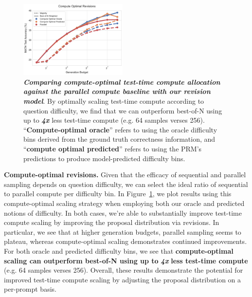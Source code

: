 \begin{figure}
  \centering
  \vspace{-0.5cm}
  \includegraphics[width=0.48\textwidth]{figures/compute_optimal_revisions_v4.pdf}
  \vspace{-0.25cm}
  \caption{\footnotesize{\textbf{\emph{Comparing compute-optimal test-time compute allocation against the parallel compute baseline with our revision model}}. By optimally scaling test-time compute according to question difficulty, we find that we can outperform best-of-N using up to \emph{\textbf{4x}} less test-time compute (e.g. 64 samples verses 256). ``\textbf{Compute-optimal oracle}'' refers to using the oracle difficulty bins derived from the ground truth correctness information, and ``\textbf{compute optimal predicted}'' refers to using the PRM's predictions to produce model-predicted difficulty bins.}}
  \label{fig:compute_optimal_revisions}
  \vspace{-0.7cm}
\end{figure}
\textbf{Compute-optimal revisions.} Given that the efficacy of sequential and parallel sampling depends on question difficulty, we can select the ideal ratio of sequential to parallel compute per difficulty bin. In Figure~\ref{fig:compute_optimal_revisions}, we plot results using this compute-optimal scaling strategy when employing both our oracle and predicted notions of difficulty. In both cases, we're able to substantially improve test-time compute scaling by improving the proposal distribution via revisions. In particular, we see that at higher generation budgets, parallel sampling seems to plateau, whereas compute-optimal scaling demonstrates continued improvements. For both oracle and predicted difficulty bins, we see that \textbf{compute-optimal scaling can outperform best-of-N using up to} \emph{\textbf{4x}} \textbf{less test-time compute} (e.g. 64 samples verses 256). Overall, these results demonstrate the potential for improved test-time compute scaling by adjusting the proposal distribution on a per-prompt basis.


